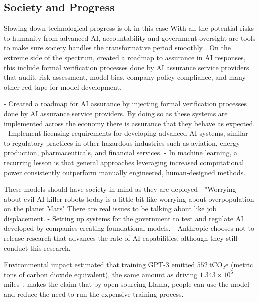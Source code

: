 \subsection{Society and Progress}

Slowing down technological progress is ok in this case
With all the potential risks to humanity from advanced AI, accountability and government oversight are tools to make sure society handles the transformative period smoothly \citep{government_of_the_united_kingdom_roadmap_2021}. On the extreme side of the spectrum, \cite{government_of_the_united_kingdom_roadmap_2021} created a roadmap to assurance in AI responses, this include formal verification processes done by AI assurance service providers that audit, risk assessment, model bias, company policy compliance, and many other red tape for model development.

\citep{government_of_the_united_kingdom_roadmap_2021} - Created a roadmap for AI assurance by injecting formal verification processes done by AI assurance service providers. By doing so as these systems are implemented across the economy there is assurance that they behave as expected.
\citep{anderljung_frontier_2023} - Implement licensing requirements for developing advanced AI systems, similar to regulatory practices in other hazardous industries such as aviation, energy production, pharmaceuticals, and financial services.
\citep{sutton_bitter_2019} - In machine learning, a recurring lesson is that general approaches leveraging increased computational power consistently outperform manually engineered, human-designed methods.


These models should have society in mind as they are deployed
\citep{ng_andrew_2017} - "Worrying about evil AI killer robots today is a little bit like worrying about overpopulation on the planet Mars" There are real issues to be talking about like job displacement.
\citep{the_white_house_fact_2023} - Setting up systems for the government to test and regulate AI developed by companies creating foundational models.
\citep{anthropic_core_2023} - Anthropic chooses not to release research that advances the rate of AI capabilities, although they still conduct this research.


Environmental impact
\cite{patterson_2021_carbon} estimated that training GPT-3 emitted $552~\text{tCO}_{2}\text{e}$ (metric tons of carbon dioxide equivalent), the same amount as driving $1.343 \times 10^{6}$ miles~\citep{epa_2014_vehicle}. \cite{touvron_llama_2023} makes the claim that by open-sourcing Llama, people can use the model and reduce the need to run the expensive training process. 

